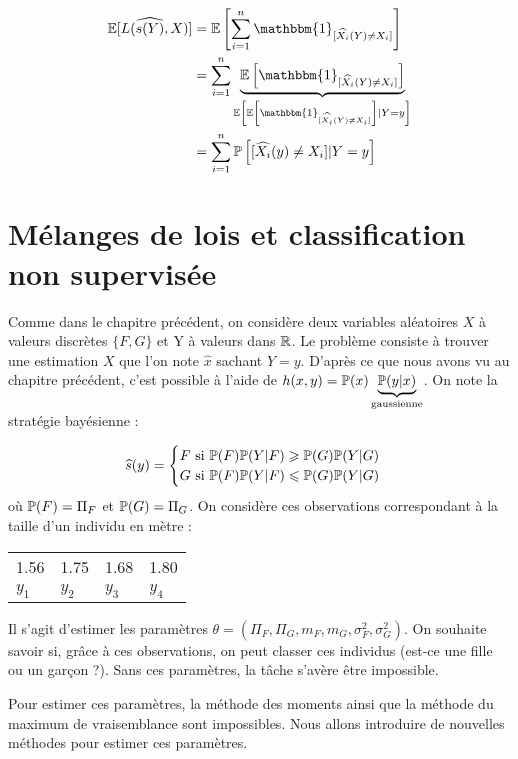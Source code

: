 \begin{equation*}
\begin{split}
  \E[L(\widehat{s(Y)},X)] &= \E\left[ \sum_{i=1}^n \mathbbm{1}_{[\widehat{X_i}(Y) \neq X_i]} \right] \\
   &= \sum_{i=1}^n \underbrace{\E\left[ \mathbbm{1}_{[\widehat{X_i}(Y) \neq X_i]} \right]}_{\E\left[\E\left[ \mathbbm{1}_{[\widehat{X_i}(Y) \neq X_i]} \right]\vert Y=y \right]} \\
   &= \sum_{i=1}^n \P\left[ {[\widehat{X_i}(y) \neq X_i]} \vert Y=y \right] \\
\end{split}
\end{equation*}

\chapter{Mélanges de lois et classification non supervisée}

Comme dans le chapitre précédent, on considère deux variables aléatoires $X$ à valeurs discrètes $\{F, G \}$ et Y à valeurs dans $\R$. Le problème consiste à trouver une estimation $X$ que l'on note $\widehat{x}$ sachant $Y=y$. D'après ce que nous avons vu au chapitre précédent, c'est possible à l'aide de $h(x,y) = \P(x)\underbrace{\P(y \vert x)}_\text{gaussienne}$. On note la stratégie bayésienne :

\[\widehat{s}(y) = 
  \begin{cases}
    F \text{ si } \P(F)\P(Y \vert F) \geq \P(G) \P(Y \vert G ) \\
    G \text{ si } \P(F)\P(Y \vert F) \leq \P(G) \P(Y \vert G )
  \end{cases}
\]
où $\P(F) = \Pi_F$ et $\P(G) = \Pi_G$. On considère ces observations correspondant à la taille d'un individu en mètre :
\begin{center}
\begin{tabular}{llll}
  1.56 & 1.75 & 1.68 & 1.80 \\
$y_1$ & $y_2$ & $y_3$ & $y_4$
\end{tabular}

\end{center}

Il s'agit d'estimer les paramètres $\theta = (\Pi_F, \Pi_G, m_F, m_G, \sigma^2_F, \sigma^2_G)$. On souhaite savoir si, grâce à ces observations, on peut classer ces individus (est-ce une fille ou un garçon ?). Sans ces paramètres, la tâche s'avère être impossible.

Pour estimer ces paramètres, la méthode des moments ainsi que la méthode du maximum de vraisemblance sont impossibles. Nous allons introduire de nouvelles méthodes pour estimer ces paramètres.

